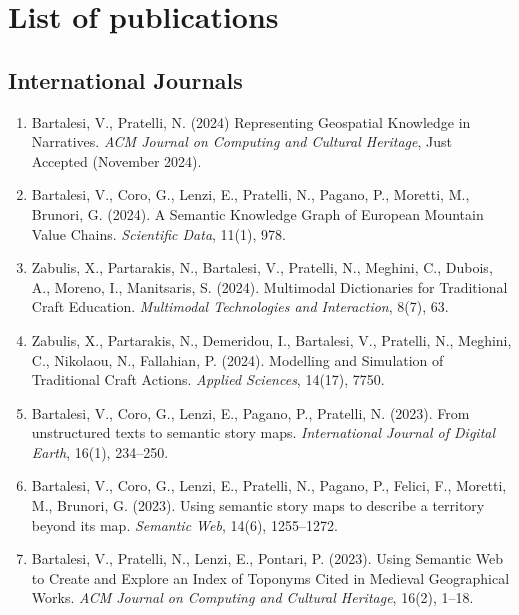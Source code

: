 \chapter*{List of publications}

\section*{International Journals}
\begin{enumerate}[
    leftmargin=*,
    label={J\arabic*.},
    ref={J\arabic*.}]
    \item Bartalesi, V., Pratelli, N. (2024) Representing Geospatial Knowledge in Narratives.  \emph{ACM Journal on Computing and Cultural Heritage}, Just Accepted (November 2024).
    \item Bartalesi, V., Coro, G., Lenzi, E., Pratelli, N., Pagano, P., Moretti, M., Brunori, G. (2024). A Semantic Knowledge Graph of European Mountain Value Chains. \emph{Scientific Data}, 11(1), 978.
    \item Zabulis, X., Partarakis, N., Bartalesi, V., Pratelli, N., Meghini, C., Dubois, A., Moreno, I., Manitsaris, S. (2024). Multimodal Dictionaries for Traditional Craft Education. \emph{Multimodal Technologies and Interaction}, 8(7), 63.
    \item Zabulis, X., Partarakis, N., Demeridou, I., Bartalesi, V., Pratelli, N., Meghini, C., Nikolaou, N.,  Fallahian, P. (2024). Modelling and Simulation of Traditional Craft Actions. \emph{Applied Sciences}, 14(17), 7750.
    \item Bartalesi, V., Coro, G., Lenzi, E., Pagano, P., Pratelli, N. (2023). From unstructured texts to semantic story maps. \emph{International Journal of Digital Earth}, 16(1), 234–250.
    \item Bartalesi, V., Coro, G., Lenzi, E., Pratelli, N., Pagano, P., Felici, F., Moretti, M., Brunori, G. (2023). Using semantic story maps to describe a territory beyond its map. \emph{Semantic Web}, 14(6), 1255–1272.
    \item Bartalesi, V., Pratelli, N., Lenzi, E., Pontari, P. (2023). Using Semantic Web to Create and Explore an Index of Toponyms Cited in Medieval Geographical Works. \emph{ACM Journal on Computing and Cultural Heritage}, 16(2), 1–18.

\end{enumerate}
